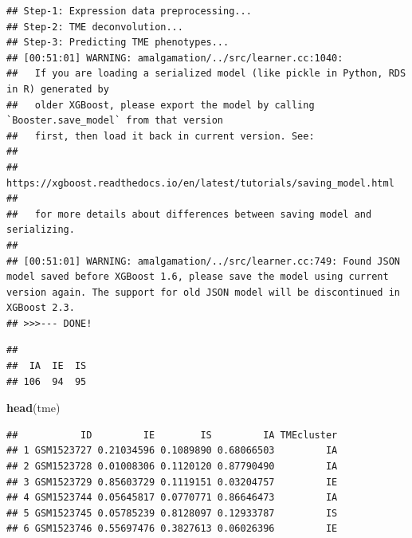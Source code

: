\documentclass[
  12pt,
]{book}
\newenvironment{Shaded}{\begin{snugshade}}{\end{snugshade}}
\newcommand{\FunctionTok}[1]{\textcolor[rgb]{0.13,0.29,0.53}{\textbf{#1}}}
\newcommand{\NormalTok}[1]{#1}
\newcommand{\SpecialCharTok}[1]{\textcolor[rgb]{0.81,0.36,0.00}{\textbf{#1}}}
\theoremstyle{definition}
\theoremstyle{definition}
\theoremstyle{definition}
\theoremstyle{definition}
\theoremstyle{remark}
\begin{document}
\begin{verbatim}
## Step-1: Expression data preprocessing...
## Step-2: TME deconvolution...
## Step-3: Predicting TME phenotypes...
## [00:51:01] WARNING: amalgamation/../src/learner.cc:1040: 
##   If you are loading a serialized model (like pickle in Python, RDS in R) generated by
##   older XGBoost, please export the model by calling `Booster.save_model` from that version
##   first, then load it back in current version. See:
## 
##     https://xgboost.readthedocs.io/en/latest/tutorials/saving_model.html
## 
##   for more details about differences between saving model and serializing.
## 
## [00:51:01] WARNING: amalgamation/../src/learner.cc:749: Found JSON model saved before XGBoost 1.6, please save the model using current version again. The support for old JSON model will be discontinued in XGBoost 2.3.
## >>>--- DONE!
\end{verbatim}

\begin{Shaded}
\end{Shaded}

\begin{verbatim}
## 
##  IA  IE  IS 
## 106  94  95
\end{verbatim}

\begin{Shaded}
\begin{Highlighting}[]
\FunctionTok{head}\NormalTok{(tme)}
\end{Highlighting}
\end{Shaded}

\begin{verbatim}
##           ID         IE        IS         IA TMEcluster
## 1 GSM1523727 0.21034596 0.1089890 0.68066503         IA
## 2 GSM1523728 0.01008306 0.1120120 0.87790490         IA
## 3 GSM1523729 0.85603729 0.1119151 0.03204757         IE
## 4 GSM1523744 0.05645817 0.0770771 0.86646473         IA
## 5 GSM1523745 0.05785239 0.8128097 0.12933787         IS
## 6 GSM1523746 0.55697476 0.3827613 0.06026396         IE
\end{verbatim}

\begin{Shaded}
\end{Shaded}
\end{document}
